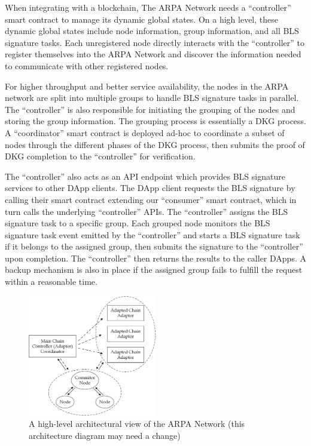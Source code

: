 \documentclass[11pt]{article}
\begin{document}
When integrating with a blockchain, The ARPA Network needs a ``controller'' smart contract to manage its dynamic global states. On a high level, these dynamic global states include node information, group information, and all BLS signature tasks. Each unregistered node directly interacts with the ``controller'' to register themselves into the ARPA Network and discover the information needed to communicate with other registered nodes.

For higher throughput and better service availability, the nodes in the ARPA network are split into multiple groups to handle BLS signature tasks in parallel. The ``controller'' is also responsible for initiating the grouping of the nodes and storing the group information. The grouping process is essentially a DKG process. A ``coordinator'' smart contract is deployed ad-hoc to coordinate a subset of nodes through the different phases of the DKG process, then submits the proof of DKG completion to the ``controller'' for verification.

The ``controller'' also acts as an API endpoint which provides BLS signature services to other DApp clients. The DApp client requests the BLS signature by calling their smart contract extending our ``consumer'' smart contract, which in turn calls the underlying ``controller'' APIs. The ``controller'' assigns the BLS signature task to a specific group. Each grouped node monitors the BLS signature task event emitted by the ``controller'' and starts a BLS signature task if it belongs to the assigned group, then submits the signature to the ``controller'' upon completion. The ``controller'' then returns the results to the caller DApps. A backup mechanism is also in place if the assigned group fails to fulfill the request within a reasonable time.

\begin{figure}
    \centering
    \includegraphics[width=0.5\textwidth]{figures/arpa network high level architecture.png}
    \caption{A high-level architectural view of the ARPA Network (this architecture diagram may need a change)}
    \label{fig:arch}
\end{figure}
\end{document}

